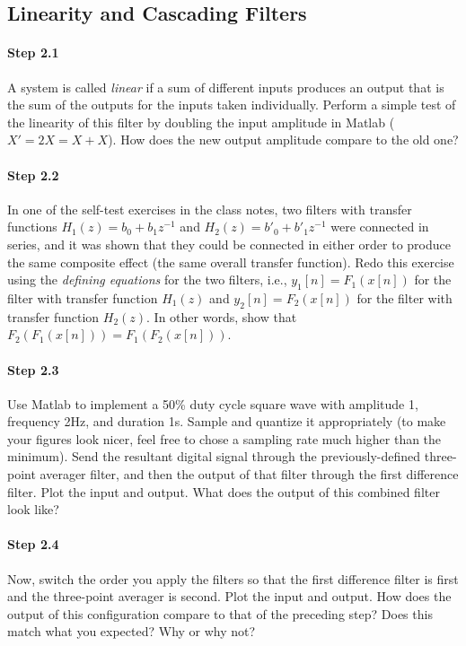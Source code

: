\subsection{Linearity and Cascading Filters}

\paragraph{Step 2.1} A system is called \emph{linear} if a sum of
different inputs produces an output that is the sum of the outputs for
the inputs taken individually.  Perform a simple test of the linearity
of this filter by doubling the input amplitude in Matlab ($X' = 2X = X
+ X$). How does the new output amplitude compare to the old one?


\paragraph{Step 2.2} In one of the self-test exercises in the class
notes, two filters with transfer functions $H_1(z) = b_0 + b_1z^{-1}$
and $H_2(z) = b'_0 + b'_1z^{-1}$ were connected in series, and it was
shown that they could be connected in either order to produce the same
composite effect (the same overall transfer function). Redo this
exercise using the \emph{defining equations} for the two filters,
i.e., $y_1[n] = F_1(x[n])$ for the filter with transfer function
$H_1(z)$ and $y_2[n] = F_2(x[n])$ for the filter with transfer
function $H_2(z)$. In other words, show that $F_2(F_1(x[n])) =
F_1(F_2(x[n]))$.


\paragraph{Step 2.3} Use Matlab to implement a 50\% duty cycle square
wave with amplitude 1, frequency 2Hz, and duration 1s. Sample and
quantize it appropriately (to make your figures look nicer, feel free
to chose a sampling rate much higher than the minimum). Send the
resultant digital signal through the previously-defined three-point
averager filter, and then the output of that filter through the first
difference filter. Plot the input and output. What does the output of
this combined filter look like?


\paragraph{Step 2.4} Now, switch the order you apply the filters so
that the first difference filter is first and the three-point averager
is second. Plot the input and output. How does the output of this
configuration compare to that of the preceding step? Does this match
what you expected? Why or why not?


